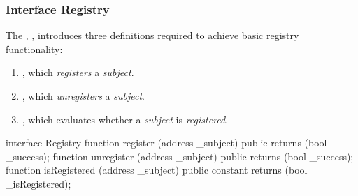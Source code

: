 \subsubsection{Interface Registry}

The , , introduces three 
definitions required to achieve basic registry functionality:

\begin{enumerate}
  \item {}, which \emph{registers} a \emph{subject}.

  \item {}, which \emph{unregisters} a \emph{subject}.

  \item {}, which evaluates whether a \emph{subject} is
    \emph{registered}.
\end{enumerate}

\begin{solidity}
interface Registry {
  function register (address _subject) public returns (bool _success);
  function unregister (address _subject) public returns (bool _success);
  function isRegistered (address _subject) public constant returns (bool _isRegistered);
}
\end{solidity}

